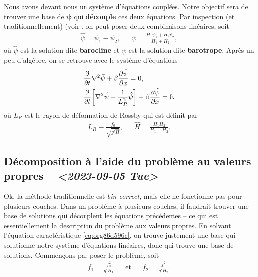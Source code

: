 \documentclass[10pt]{article}
\numberwithin{equation}{section}
\begin{document}
Nous avons devant nous un système d'équations couplées.
Notre objectif sera de trouver une base de \(\boldsymbol{\psi}\) qui \textbf{découple} ces deux équations.
Par inspection (et traditionnellement) (voir \autocite[p.230]{vallis_2006}, on peut poser deux combinaisons linéaires, soit
\begin{align}
   &&\hat{\psi} = \psi_1 - \psi_2 ,&& \bar{\psi} = \frac{H_1\psi_1 + H_2\psi_2}{H_1+H_2}, &&
\end{align}
où \(\hat{\psi}\) est la solution dite \textbf{barocline} et \(\bar{\psi}\) est la solution dite \textbf{barotrope}.
Après un peu d'algèbre, on se retrouve avec le système d'équations
\begin{subequations}
\begin{align}
   &\pdv{}{t} \laplacian\bar{\psi} + \beta \pdv{\bar{\psi}}{x} = 0,\\
   &\pdv{}{t} \qty[\laplacian\hat{\psi} + \frac{1}{L_R^2}\hat{\psi}] + \beta \pdv{\hat{\psi}}{x} = 0,
\end{align}
\end{subequations}
où \(L_R\) est le rayon de déformation de Rossby qui est définit par
\begin{align}
   && L_R \equiv \frac{f_0}{\sqrt{g'\hat{H}}}, && \hat{H} = \frac{H_1H_2}{H_1+H_2}.&&
\end{align}

\subsection{Décomposition à l'aide du problème au valeurs propres -- \textit{<2023-09-05 Tue>}}
\label{sec:org82d7b45}

Ok, la méthode traditionnelle est \emph{bin correct}, mais elle ne fonctionne pas pour plusieurs couches.
Dans un problème à plusieurs couches, il faudrait trouver une base de solutions qui découplent les équations précédentes -- ce qui est essentiellement la description du problème aux valeurs propres.
En solvant l'équation caractéristique \ref{eq:org86d596c}, on trouve justement une base qui solutionne notre système d'équations linéaires, donc qui trouve une base de solutions.
Commençons par poser le problème, soit
\begin{align}
   && f_1 = \frac{f_0^2}{g'H_1} && \text{et} && f_2 = \frac{f_0^2}{g'H_2}. &&
\end{align}
\end{document}
